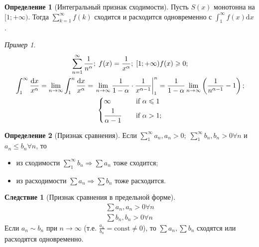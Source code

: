 \documentclass[a4paper,12pt]{article}
\theoremstyle{remark}
\newtheorem*{example}{Пример}
\theoremstyle{definition}
\newtheorem{definition}{Определение}
\newtheorem*{effect}{Следствие}
\begin{document}
\begin{definition}[Интегральный признак сходимости]
    Пусть \(S(x)\) монотонна на \([1;+\infty)\). Тогда \(\sum_{k = 1}^{\infty} f(k)\) сходится и расходится одновременно с \(\int_{1}^{\infty} \! f(x) \mathrm{d}x\).
\end{definition}

\begin{example}
    \begin{gather*}
        \sum_{n=1}^{\infty} \frac{1}{n^\alpha};\; f(x) = \frac{1}{x^\alpha};\; [1;+\infty) f(x) \geqslant 0; \\
        \int_{1}^{\infty} \frac{\mathrm{d}x}{x^\alpha} = \lim_{n \rightarrow \infty} \int_{1}^{n} \frac{\mathrm{d}x}{x^\alpha} = \left. \lim_{n \rightarrow \infty} \frac{1}{1 - \alpha} \cdot \frac{1}{x^{\alpha - 1}} \right |_1^n = \frac{1}{1 - \alpha} \lim_{n \rightarrow \infty} \left({\frac{1}{n^{\alpha - 1}} - 1}\right); \\
        \begin{dcases}
            \infty & \quad \text{if } \alpha \leqslant 1 \\
            \frac{1}{\alpha - 1} & \quad \text{if } \alpha > 1;
        \end{dcases}
    \end{gather*}
\end{example}


\begin{definition}[Признак сравнения]
    Если \(\sum_{1}^{\infty} a_n, a_n > 0;\; \sum_{1}^{\infty} b_n, b_n > 0 \forall n\) и \(a_n \leqslant b_n \forall n\), то
    \begin{itemize}
        \item из сходимости \(\sum_{1}^{\infty} b_n \Rightarrow \sum a_n\) тоже сходится;
        \item из расходимости \(\sum a_n \Rightarrow \sum b_n\) тоже расходится.
    \end{itemize}
\end{definition}

\begin{effect}[Признак сравнения в предельной форме]
    \begin{gather*}
        \sum a_n, a_n > 0 \forall n \\
        \sum b_n, b_n > 0 \forall n
    \end{gather*}
    Если \(a_n \sim b_n\) при \(n \rightarrow \infty\) (т.е. \(\frac{a_n}{b_n} = \text{const} \neq 0\)), то \(\sum a_n, \sum b_n\) сходятся или расходятся одновременно.
\end{effect}
\end{document}
